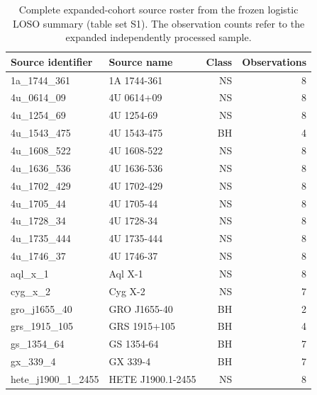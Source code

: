 \documentclass[final,5p,authoryear,nopreprintline]{elsarticle}
\begin{document}
\begin{table}[!tp]
\centering
\caption{Complete expanded-cohort source roster from the frozen logistic LOSO summary (table set S1). The observation counts refer to the expanded independently processed sample.}\label{tab:roster}
\begin{tabular}{llrr}
\toprule Source identifier & Source name & Class & Observations \\\midrule

1a\_1744\_361 & 1A 1744-361 & NS & 8 \\

4u\_0614\_09 & 4U 0614+09 & NS & 8 \\

4u\_1254\_69 & 4U 1254-69 & NS & 8 \\

4u\_1543\_475 & 4U 1543-475 & BH & 4 \\

4u\_1608\_522 & 4U 1608-522 & NS & 8 \\

4u\_1636\_536 & 4U 1636-536 & NS & 8 \\

4u\_1702\_429 & 4U 1702-429 & NS & 8 \\

4u\_1705\_44 & 4U 1705-44 & NS & 8 \\

4u\_1728\_34 & 4U 1728-34 & NS & 8 \\

4u\_1735\_444 & 4U 1735-444 & NS & 8 \\

4u\_1746\_37 & 4U 1746-37 & NS & 8 \\

aql\_x\_1 & Aql X-1 & NS & 8 \\

cyg\_x\_2 & Cyg X-2 & NS & 7 \\

gro\_j1655\_40 & GRO J1655-40 & BH & 2 \\

grs\_1915\_105 & GRS 1915+105 & BH & 4 \\

gs\_1354\_64 & GS 1354-64 & BH & 7 \\

gx\_339\_4 & GX 339-4 & BH & 7 \\

hete\_j1900\_1\_2455 & HETE J1900.1-2455 & NS & 8 \\


\end{tabular}
\end{table}
\end{document}
